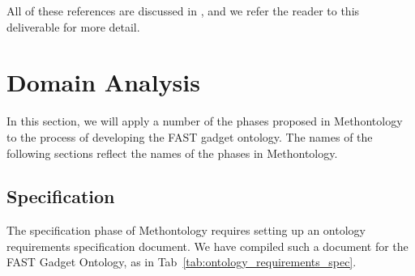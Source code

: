 \documentclass{fast_latex}
\begin{document}
All of these references are discussed in \cite{urmetzer2010fast_state_of_the_art}, and we refer the reader to this deliverable for more detail.

\section{Domain Analysis} %
\label{sec:domain_analysis}

In this section, we will apply a number of the phases proposed in Methontology to the process of developing the FAST gadget ontology. The names of the following sections reflect the names of the phases in Methontology.

\subsection{Specification} %
\label{sub:specification}

The specification phase of Methontology requires setting up an ontology requirements specification document. We have compiled such a document for the FAST Gadget Ontology, as in Tab~\ref{tab:ontology_requirements_spec}.
\end{document}
